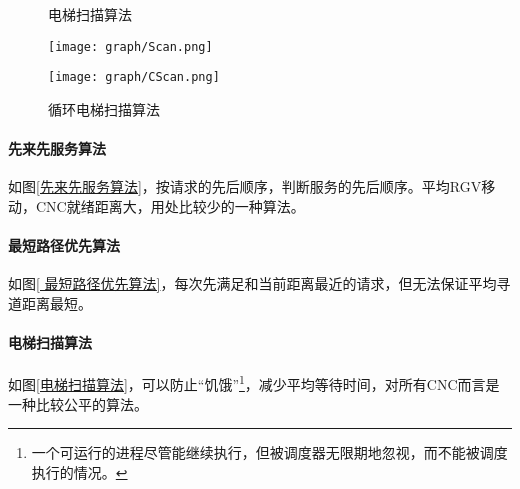 			\begin{figure}[htbp]
				\centering
				\begin{minipage}[htbp]{6cm}
					\centering
					\caption{电梯扫描算法}
					\label{电梯扫描算法}
					\texttt{[image: graph/Scan.png]}
				\end{minipage}
				\begin{minipage}[htbp]{6cm}
					\centering
					\caption{循环电梯扫描算法}
					\label{循环电梯扫描算法}
					\texttt{[image: graph/CScan.png]}
				\end{minipage}
			\end{figure}
			\paragraph{先来先服务算法}如图\ref{先来先服务算法}，按请求的先后顺序，判断服务的先后顺序。平均RGV移动，CNC就绪距离大，用处比较少的一种算法。
			\paragraph{ 最短路径优先算法}如图\ref{ 最短路径优先算法}，每次先满足和当前距离最近的请求，但无法保证平均寻道距离最短。
			\paragraph{电梯扫描算法}如图\ref{电梯扫描算法}，可以防止“饥饿”\footnote{一个可运行的进程尽管能继续执行，但被调度器无限期地忽视，而不能被调度执行的情况。}，减少平均等待时间，对所有CNC而言是一种比较公平的算法。
